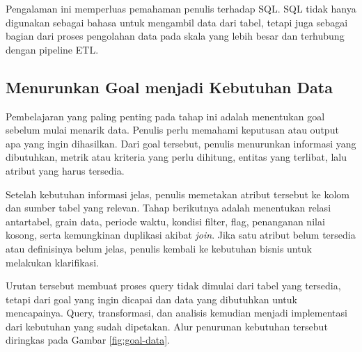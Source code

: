 Pengalaman ini memperluas pemahaman penulis terhadap SQL. SQL tidak hanya digunakan sebagai bahasa untuk mengambil data dari tabel, tetapi juga sebagai bagian dari proses pengolahan data pada skala yang lebih besar dan terhubung dengan pipeline ETL.

\subsection{Menurunkan Goal menjadi Kebutuhan Data}

Pembelajaran yang paling penting pada tahap ini adalah menentukan goal sebelum mulai menarik data. Penulis perlu memahami keputusan atau output apa yang ingin dihasilkan. Dari goal tersebut, penulis menurunkan informasi yang dibutuhkan, metrik atau kriteria yang perlu dihitung, entitas yang terlibat, lalu atribut yang harus tersedia.

Setelah kebutuhan informasi jelas, penulis memetakan atribut tersebut ke kolom dan sumber tabel yang relevan. Tahap berikutnya adalah menentukan relasi antartabel, grain data, periode waktu, kondisi filter, flag, penanganan nilai kosong, serta kemungkinan duplikasi akibat \textit{join}. Jika satu atribut belum tersedia atau definisinya belum jelas, penulis kembali ke kebutuhan bisnis untuk melakukan klarifikasi.

Urutan tersebut membuat proses query tidak dimulai dari tabel yang tersedia, tetapi dari goal yang ingin dicapai dan data yang dibutuhkan untuk mencapainya. Query, transformasi, dan analisis kemudian menjadi implementasi dari kebutuhan yang sudah dipetakan. Alur penurunan kebutuhan tersebut diringkas pada Gambar \ref{fig:goal-data}.

